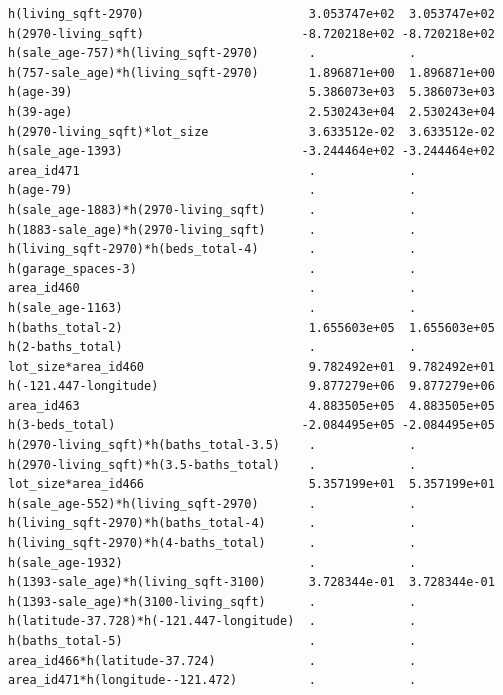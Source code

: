 \documentclass[
]{article}
\begin{document}
\begin{verbatim}
h(living_sqft-2970)                       3.053747e+02  3.053747e+02
h(2970-living_sqft)                      -8.720218e+02 -8.720218e+02
h(sale_age-757)*h(living_sqft-2970)       .             .           
h(757-sale_age)*h(living_sqft-2970)       1.896871e+00  1.896871e+00
h(age-39)                                 5.386073e+03  5.386073e+03
h(39-age)                                 2.530243e+04  2.530243e+04
h(2970-living_sqft)*lot_size              3.633512e-02  3.633512e-02
h(sale_age-1393)                         -3.244464e+02 -3.244464e+02
area_id471                                .             .           
h(age-79)                                 .             .           
h(sale_age-1883)*h(2970-living_sqft)      .             .           
h(1883-sale_age)*h(2970-living_sqft)      .             .           
h(living_sqft-2970)*h(beds_total-4)       .             .           
h(garage_spaces-3)                        .             .           
area_id460                                .             .           
h(sale_age-1163)                          .             .           
h(baths_total-2)                          1.655603e+05  1.655603e+05
h(2-baths_total)                          .             .           
lot_size*area_id460                       9.782492e+01  9.782492e+01
h(-121.447-longitude)                     9.877279e+06  9.877279e+06
area_id463                                4.883505e+05  4.883505e+05
h(3-beds_total)                          -2.084495e+05 -2.084495e+05
h(2970-living_sqft)*h(baths_total-3.5)    .             .           
h(2970-living_sqft)*h(3.5-baths_total)    .             .           
lot_size*area_id466                       5.357199e+01  5.357199e+01
h(sale_age-552)*h(living_sqft-2970)       .             .           
h(living_sqft-2970)*h(baths_total-4)      .             .           
h(living_sqft-2970)*h(4-baths_total)      .             .           
h(sale_age-1932)                          .             .           
h(1393-sale_age)*h(living_sqft-3100)      3.728344e-01  3.728344e-01
h(1393-sale_age)*h(3100-living_sqft)      .             .           
h(latitude-37.728)*h(-121.447-longitude)  .             .           
h(baths_total-5)                          .             .           
area_id466*h(latitude-37.724)             .             .           
area_id471*h(longitude--121.472)          .             .           
                                                                    

\end{verbatim}
\end{document}
